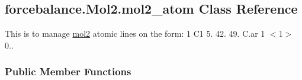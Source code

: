 \hypertarget{classforcebalance_1_1Mol2_1_1mol2__atom}{\subsection{forcebalance.\-Mol2.\-mol2\-\_\-atom \-Class \-Reference}
\label{classforcebalance_1_1Mol2_1_1mol2__atom}
}


\-This is to manage \hyperlink{classforcebalance_1_1Mol2_1_1mol2}{mol2} atomic lines on the form\-: 1 \-C1 5. 42. 49. \-C.\-ar 1 $<$1$>$ 0..  


\subsubsection*{\-Public \-Member \-Functions}
